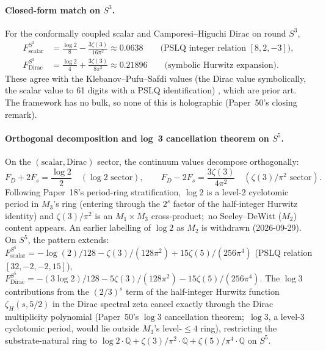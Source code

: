 \documentclass[11pt,a4paper]{article}
\theoremstyle{plain}
\theoremstyle{definition}
\newcommand{\sthree}{S^{3}}
\newcommand{\sfive}{S^{5}}
\newcommand{\Q}{\mathbb{Q}}
\begin{document}
\paragraph{Closed-form match on $\sthree$.}
For the conformally coupled scalar and Camporesi--Higuchi Dirac on
round $\sthree$,
\begin{align*}
F_{\mathrm{scalar}}^{\sthree}
&= \frac{\log 2}{8} - \frac{3\zeta(3)}{16\pi^{2}}
\approx 0.0638
\qquad\text{(PSLQ integer relation $[8, 2, -3]$)},\\
F_{\mathrm{Dirac}}^{\sthree}
&= \frac{\log 2}{4} + \frac{3\zeta(3)}{8\pi^{2}}
\approx 0.21896
\qquad\text{(symbolic Hurwitz expansion)}.
\end{align*}
These agree with the Klebanov--Pufu--Safdi values (the Dirac value
symbolically, the scalar value to 61 digits with a PSLQ identification)
\cite{klebanov_pufu_safdi2011}, which are prior art.  The framework has
no bulk, so none of this is holographic (Paper~50's closing remark).

\paragraph{Orthogonal decomposition and log~3 cancellation theorem
on $\sfive$.}
On the $(\text{scalar}, \text{Dirac})$ sector, the continuum values
decompose orthogonally:
\begin{equation*}
F_{D} + 2 F_{s} = \frac{\log 2}{2} \quad (\log 2\text{ sector}),
\qquad
F_{D} - 2 F_{s} = \frac{3 \zeta(3)}{4 \pi^{2}} \quad (\zeta(3)/\pi^{2}\text{ sector}).
\end{equation*}
Following Paper~18's period-ring stratification, $\log 2$ is a level-2
cyclotomic period in $M_{3}$'s ring (entering through the $2^{s}$ factor
of the half-integer Hurwitz identity) and $\zeta(3)/\pi^{2}$ is an
$M_{1}\times M_{3}$ cross-product;\ no Seeley--DeWitt ($M_{2}$) content
appears.  An earlier labelling of $\log 2$ as $M_{2}$ is withdrawn
(2026-09-29).
On $\sfive$, the pattern extends:
$F_{\mathrm{scalar}}^{\sfive} = -\log(2)/128 - \zeta(3)/(128\pi^{2})
+ 15\zeta(5)/(256\pi^{4})$ (PSLQ relation $[32, -2, -2, 15]$),
$F_{\mathrm{Dirac}}^{\sfive} = -(3\log 2)/128 - 5\zeta(3)/(128\pi^{2})
- 15\zeta(5)/(256\pi^{4})$.  The $\log 3$ contributions from the
$(2/3)^{s}$ term of the half-integer Hurwitz function
$\zeta_{H}(s, 5/2)$ in the Dirac spectral zeta cancel exactly through
the Dirac multiplicity polynomial (Paper~50's $\log 3$ cancellation
theorem;\ $\log 3$, a level-3 cyclotomic period, would lie outside
$M_{3}$'s level-$\le 4$ ring), restricting the substrate-natural ring to $\log 2 \cdot \Q + \zeta(3)/
\pi^{2} \cdot \Q + \zeta(5)/\pi^{4} \cdot \Q$ on $\sfive$.
\end{document}
